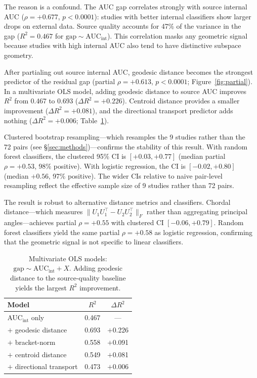 \documentclass{article}
\begin{document}
The reason is a confound. The AUC gap correlates strongly with source internal AUC ($\rho = +0.677$, $p < 0.0001$): studies with better internal classifiers show larger drops on external data. Source quality accounts for 47\% of the variance in the gap ($R^2 = 0.467$ for $\text{gap} \sim \text{AUC}_{\mathrm{int}}$). This correlation masks any geometric signal because studies with high internal AUC also tend to have distinctive subspace geometry.

After partialing out source internal AUC, geodesic distance becomes the strongest predictor of the residual gap (partial $\rho = +0.613$, $p < 0.0001$; Figure~\ref{fig:partial}). In a multivariate OLS model, adding geodesic distance to source AUC improves $R^2$ from 0.467 to 0.693 ($\Delta R^2 = +0.226$). Centroid distance provides a smaller improvement ($\Delta R^2 = +0.081$), and the directional transport predictor adds nothing ($\Delta R^2 = +0.006$; Table~\ref{tab:multivariate}).

Clustered bootstrap resampling---which resamples the 9 studies rather than the 72 pairs (see \S\ref{sec:methods})---confirms the stability of this result. With random forest classifiers, the clustered 95\% CI is $[+0.03, +0.77]$ (median partial $\rho = +0.53$, 98\% positive). With logistic regression, the CI is $[-0.02, +0.80]$ (median $+0.56$, 97\% positive). The wider CIs relative to naive pair-level resampling reflect the effective sample size of 9 studies rather than 72 pairs.

The result is robust to alternative distance metrics and classifiers. Chordal distance---which measures $\|U_1 U_1^\top - U_2 U_2^\top\|_F$ rather than aggregating principal angles---achieves partial $\rho = +0.55$ with clustered CI $[-0.06, +0.79]$. Random forest classifiers yield the same partial $\rho = +0.58$ as logistic regression, confirming that the geometric signal is not specific to linear classifiers.

\begin{table}[t]
\centering
\caption{Multivariate OLS models: $\text{gap} \sim \text{AUC}_{\mathrm{int}} + X$. Adding geodesic distance to the source-quality baseline yields the largest $R^2$ improvement.}
\label{tab:multivariate}
\begin{tabular}{lcc}
\toprule
Model & $R^2$ & $\Delta R^2$ \\
\midrule
AUC$_{\mathrm{int}}$ only & 0.467 & --- \\
$+$ geodesic distance     & 0.693 & $+$0.226 \\
$+$ bracket-norm          & 0.558 & $+$0.091 \\
$+$ centroid distance     & 0.549 & $+$0.081 \\
$+$ directional transport & 0.473 & $+$0.006 \\
\bottomrule
\end{tabular}
\end{table}
\end{document}
